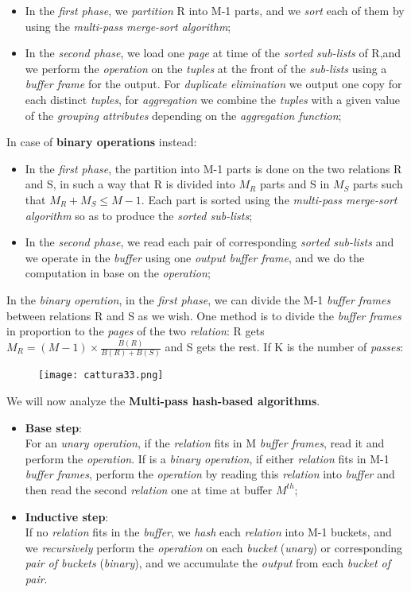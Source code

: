 \documentclass{article}
\begin{document}
\begin{itemize}
\item In the \emph{first phase}, we \emph{partition} R into M-1 parts, and we \emph{sort} each of them by using the \emph{multi-pass merge-sort algorithm};
\item In the \emph{second phase}, we load one \emph{page} at time of the \emph{sorted sub-lists} of R,and we perform the \emph{operation} on the \emph{tuples} at the front of the \emph{sub-lists} using a \emph{buffer frame} for the output. For \emph{duplicate elimination} we output one copy for each distinct \emph{tuples}, for \emph{aggregation} we combine the \emph{tuples} with a given value of the \emph{grouping attributes} depending on the \emph{aggregation function};
\end{itemize}
In case of \textbf{binary operations} instead:
\begin{itemize}
\item In the \emph{first phase}, the partition into M-1 parts is done on the two relations R and S, in such a way that R is divided into $M_R$ parts and S in $M_S$ parts such that $M_R+M_S \leq M-1$. Each part is sorted using the \emph{multi-pass merge-sort algorithm} so as to produce the \emph{sorted sub-lists};
\item In the \emph{second phase}, we read each pair of corresponding \emph{sorted sub-lists} and we operate in the \emph{buffer} using one \emph{output buffer frame}, and we do the computation in base on the \emph{operation};
\end{itemize}
In the \emph{binary operation}, in the \emph{first phase}, we can divide the M-1 \emph{buffer frames} between relations R and S as we wish. One method is to divide the \emph{buffer frames }in proportion to the \emph{pages} of the two \emph{relation}: R gets $M_R= (M-1) \times \frac{B(R)}{B(R)+B(S)}$ and S gets the rest. If K is the number of \emph{passes}:
\begin{figure}[H]
  \centering
  \texttt{[image: cattura33.png]}
\end{figure}
We will now analyze the\textbf{ Multi-pass hash-based algorithms}. 
\begin{itemize}
\item \textbf{Base step}: 
\vspace{2.5mm}\\
For an \emph{unary operation}, if the \emph{relation} fits in M \emph{buffer frames}, read it and perform the \emph{operation}. If is a \emph{binary operation}, if either \emph{relation} fits in M-1 \emph{buffer frames}, perform the \emph{operation} by reading this \emph{relation} into \emph{buffer} and then read the second \emph{relation} one at time at buffer $M^{th}$;
\item \textbf{Inductive step}: 
\vspace{2.5mm}\\
If no \emph{relation} fits in the \emph{buffer}, we \emph{hash} each \emph{relation} into M-1 buckets, and we \emph{recursively} perform the \emph{operation} on each \emph{bucket} (\emph{unary}) or corresponding \emph{pair of buckets} (\emph{binary}), and we accumulate the \emph{output} from each \emph{bucket of pair}.
\end{itemize}
\end{document}
